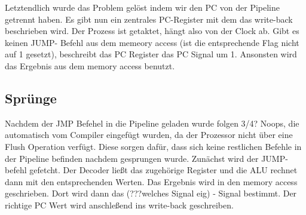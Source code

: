 \documentclass[paper=a4,fontsize=12pt,twocolumn]{scrreprt}
\begin{document}
Letztendlich wurde das Problem gelöst indem wir den PC von der Pipeline getrennt haben. Es gibt nun ein zentrales PC-Register mit dem das write-back beschrieben wird. Der Prozess ist getaktet, hängt also von der Clock ab. Gibt es keinen JUMP- Befehl aus dem memeory access (ist die entsprechende Flag nicht auf 1 gesetzt), beschreibt das PC Register das PC Signal um 1. Ansonsten wird das Ergebnis aus dem memory access benutzt. 



\subsection{Sprünge}


Nachdem der JMP Befehel in die Pipeline geladen wurde folgen 3/4? Noops, die automatisch vom Compiler eingefügt wurden, da der Prozessor nicht über eine Flush Operation verfügt. Diese sorgen dafür, dass sich keine restlichen Befehle in der Pipeline befinden nachdem gesprungen wurde.
Zunächst wird der JUMP-befehl gefetcht. Der Decoder ließt das zugehörige Register und die ALU rechnet dann mit den entsprechenden Werten. Das Ergebnis wird in den memory access geschrieben. Dort wird dann das (???welches Signal eig) - Signal bestimmt. Der richtige PC Wert wird anschleßend ins write-back geschreiben.
\end{document}
